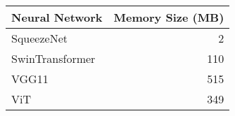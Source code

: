 \begin{tabular}{lr}
\toprule
Neural Network & Memory Size (MB) \\
\midrule
SqueezeNet & 2 \\
SwinTransformer & 110 \\
VGG11 & 515 \\
ViT & 349 \\
\bottomrule
\end{tabular}
